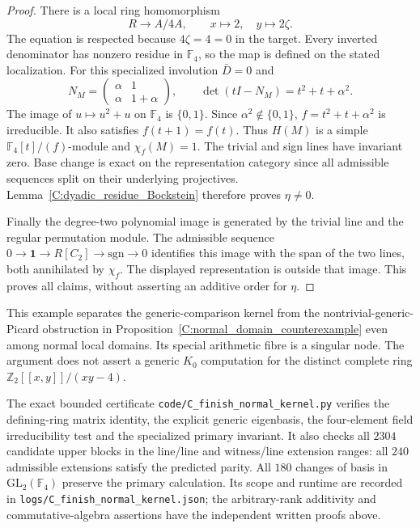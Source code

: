 \begin{proof}
There is a local ring homomorphism
\[
 R\longrightarrow A/4A,\qquad x\longmapsto2,\quad
                                  y\longmapsto2\zeta.     \tag{C.1.N5}
\]
The equation is respected because $4\zeta=4=0$ in the target.
Every inverted denominator has nonzero residue in
$\mathbb F_4$, so the map is defined on the stated localization.
For this specialized involution $\bar D=0$ and
\[
 N_M=\begin{pmatrix}\alpha&1\\\alpha&1+\alpha\end{pmatrix},
 \qquad\det(tI-N_M)=t^2+t+\alpha^2.                      \tag{C.1.N6}
\]
The image of $u\mapsto u^2+u$ on $\mathbb F_4$ is
$\{0,1\}$. Since $\alpha^2\notin\{0,1\}$,
$f=t^2+t+\alpha^2$ is irreducible. It also satisfies
$f(t+1)=f(t)$. Thus $H(M)$ is a simple
$\mathbb F_4[t]/(f)$-module and
$\chi_f(M)=1$. The trivial and sign lines have invariant zero.
Base change is exact on the representation category since
all admissible sequences split on their underlying projectives.
Lemma~\ref{C:dyadic_residue_Bockstein} therefore proves
$\eta\ne0$.

Finally the degree-two polynomial image is generated by the
trivial line and the regular permutation module. The admissible
sequence
$0\to\mathbf1\to R[C_2]\to\mathrm{sgn}\to0$
identifies this image with the span of the two lines, both
annihilated by $\chi_f$. The displayed representation is
outside that image. This proves all claims, without asserting
an additive order for $\eta$.
\end{proof}

This example separates the generic-comparison kernel from the
nontrivial-generic-Picard obstruction in
Proposition~\ref{C:normal_domain_counterexample} even among
normal local domains. Its special arithmetic fibre is a singular
node. The argument does not assert a generic $K_0$ computation
for the distinct complete ring
$\mathbb Z_2[[x,y]]/(xy-4)$.

The exact bounded certificate
\texttt{code/C\_finish\_normal\_kernel.py} verifies the defining-ring
matrix identity, the explicit generic eigenbasis, the four-element
field irreducibility test and the specialized primary invariant.
It also checks all $2304$ candidate upper blocks in the line/line
and witness/line extension ranges: all $240$ admissible extensions
satisfy the predicted parity. All $180$ changes of basis in
$\mathrm{GL}_2(\mathbb F_4)$ preserve the primary calculation.
Its scope and runtime are recorded in
\texttt{logs/C\_finish\_normal\_kernel.json}; the arbitrary-rank
additivity and commutative-algebra assertions have the independent
written proofs above.
